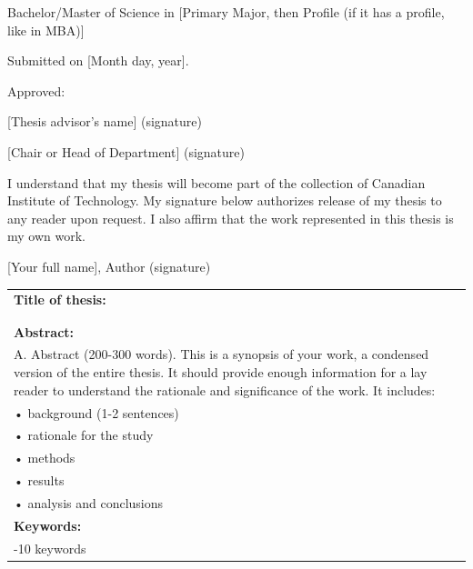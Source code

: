 \documentclass[12pt]{book}
\begin{document}
\noindent \fontsize{11}{13.5}\selectfont Bachelor/Master of Science in [Primary Major, then Profile (if it has a profile, like in MBA)] 

\noindent Submitted on [Month day, year].  

\bigskip

 \noindent  Approved:

 \noindent \underline{\hspace{3.2in}} [Thesis advisor's name] \hspace*{\fill} (signature) 
 
\bigskip
\bigskip
\bigskip
\bigskip
 
 \noindent  \underline{\hspace{3.2in}} [Chair or Head of Department] \hspace*{\fill} (signature) 

 \vspace*{\fill}

 \noindent I understand that my thesis will become part of the collection of Canadian Institute of Technology. My signature below authorizes release of my thesis to any reader upon request. I also affirm that the work represented in this thesis is my own work. 
 \bigskip
 \bigskip
 
 \noindent  \underline{\hspace{3.2in}} [Your full name], Author \hspace*{\fill} (signature) 
\setcounter{page}{2}
\newpage

\noindent \begin{tabular}{|p{6.4in}|}\hline
\textbf{\fontsize{11}{13.5}\selectfont Title of thesis:} \\
\bigskip \\  
\bigskip \\ \hline
\textbf{\fontsize{11}{13.5}\selectfont Abstract:} \\
\fontsize{11}{13.5}\selectfont A.  Abstract (200-300 words). This is a synopsis of your work, a condensed version of the entire thesis. It should provide enough information for a lay reader to understand the rationale and significance of the work. It includes: \\ •  background (1-2 sentences) \\ •  rationale for the study  \\ •  methods \\ •  results \\ •  analysis and conclusions

\vspace*{\fill}\\\hline
\textbf{\fontsize{11}{13.5}\selectfont Keywords:} \\
\fontsize{11}{13.5}\selectfont 7-10 keywords\\\hline
\end{tabular}
\end{document}
